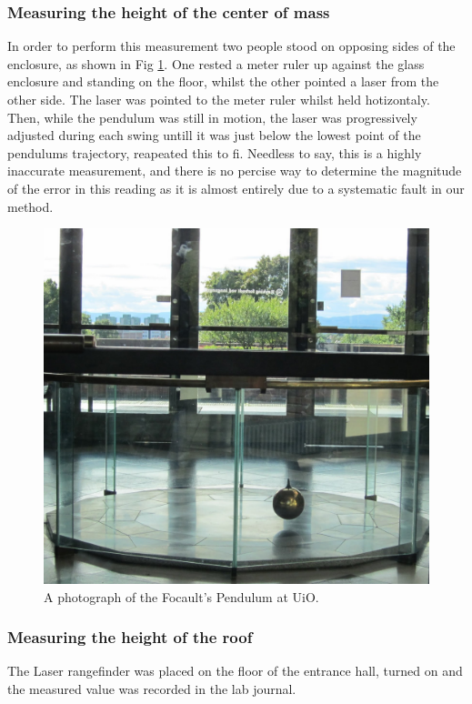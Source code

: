 \documentclass[11pt,a4paper]{article}
\begin{document}
    \subsubsection{Measuring the height of the center of mass}
      In order to perform this measurement two people stood on opposing sides of the enclosure, as shown in Fig \ref{fig:pendelfy}. One rested a meter ruler up against the glass enclosure and standing on the floor, whilst the other pointed a laser from the other side. The laser was pointed to the meter ruler whilst held hotizontaly. Then, while the pendulum was still in motion, the laser was progressively adjusted during each swing untill it was just below the lowest point of the pendulums trajectory, reapeated this to fi. Needless to say, this is a highly inaccurate measurement, and there is no percise way to determine the magnitude of the error in this reading as it is almost entirely due to a systematic fault in our method.
      \begin{figure}[H]
        \center 
        \includegraphics[scale=0.15]{scripts/figs/pendelimg.JPG}
        \caption{A photograph of the Focault's Pendulum at UiO.}
        \label{fig:pendelfy}
      \end{figure}

    \subsubsection{Measuring the height of the roof}
      The Laser rangefinder \cite{PLR} was placed on the floor of the entrance hall, turned on and the measured value was recorded in the lab journal.
\end{document}
